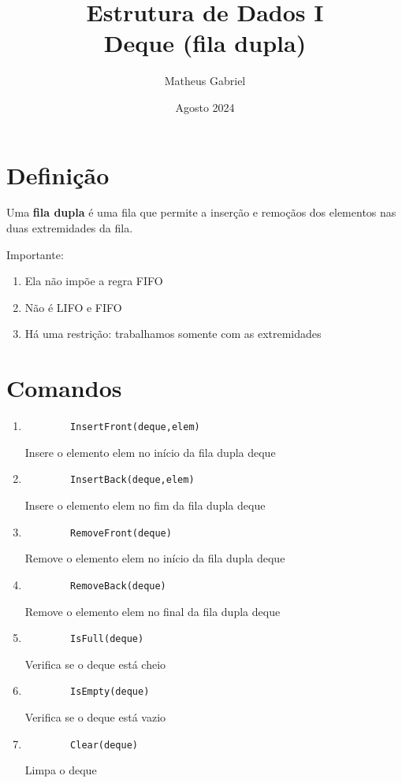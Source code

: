 \documentclass{article}
\title{Estrutura de Dados I
\\ \large Deque (fila dupla)}
\author{Matheus Gabriel}
\date{Agosto 2024}
\begin{document}
\maketitle

\section{Definição}

Uma \textbf{fila dupla} é uma fila que permite a inserção e remoçãos dos elementos nas duas extremidades da fila.

Importante:
\begin{enumerate}
    \item Ela não impõe a regra FIFO
    \item Não é LIFO e FIFO
    \item Há uma restrição: trabalhamos somente com as extremidades
\end{enumerate}

\section{Comandos}

\begin{enumerate}
    \item 
    \begin{verbatim}
        InsertFront(deque,elem)
    \end{verbatim}
     Insere o elemento elem no início da fila dupla deque 
    \item 
    \begin{verbatim}
        InsertBack(deque,elem) 
    \end{verbatim}
    Insere o elemento elem no fim da fila dupla deque
    \item 
    \begin{verbatim}
        RemoveFront(deque) 
    \end{verbatim}
    Remove o elemento elem no início da fila dupla deque
    \item 
    \begin{verbatim}
        RemoveBack(deque) 
    \end{verbatim}
    Remove o elemento elem no final da fila dupla deque
        \item 
    \begin{verbatim}
        IsFull(deque) 
    \end{verbatim}
    Verifica se o deque está cheio
        \item 
    \begin{verbatim}
        IsEmpty(deque) 
    \end{verbatim}
    Verifica se o deque está vazio
        \item 
    \begin{verbatim}
        Clear(deque) 
    \end{verbatim}
    Limpa o deque
\end{enumerate}
\end{document}
